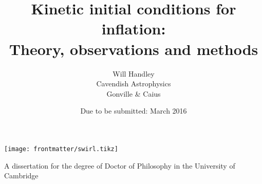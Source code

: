 \title{Kinetic initial conditions for inflation:\\ {\large Theory, observations and methods}}

\author{Will Handley\\
Cavendish Astrophysics \\
Gonville \& Caius}
\date{Due to be submitted: March 2016}

\maketitle

\begin{center}
  \texttt{[image: frontmatter/swirl.tikz]}

  A dissertation for the degree of Doctor of Philosophy
  in the University of Cambridge 
\end{center}

\cleardoublepage{}
